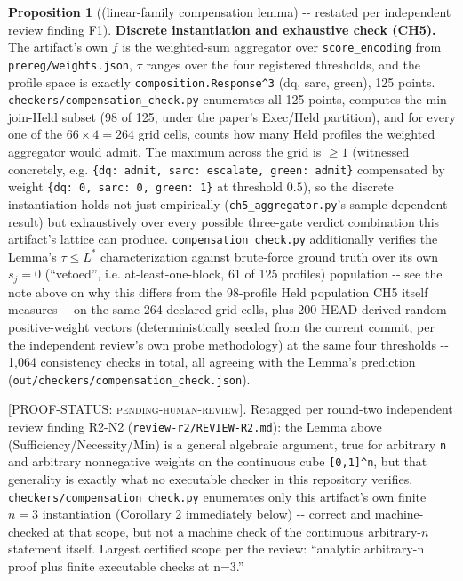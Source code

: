 \documentclass[11pt,a4paper]{article}
\theoremstyle{definition}
\newtheorem{proposition}{Proposition}
\newcommand{\proofstatus}[1]{[\textsc{PROOF-STATUS}: \textsc{#1}]}
\begin{document}
\begin{proposition}[(linear-family compensation lemma) -{}- restated per independent review finding F1]
\noindent\textbf{Discrete instantiation and exhaustive check (CH5).} The artifact's own $f$ is the weighted-sum aggregator over \texttt{score\_encoding} from \texttt{prereg/weights.json}, $\tau$ ranges over the four registered thresholds, and the profile space is exactly \texttt{composition.Response\textasciicircum3} (dq, sarc, green), 125 points. \texttt{checkers/compensation\_check.py} enumerates all 125 points, computes the min-join-Held subset (98 of 125, under the paper's Exec/Held partition), and for every one of the $66 \times 4 = 264$ grid cells, counts how many Held profiles the weighted aggregator would admit. The maximum across the grid is $\geq 1$ (witnessed concretely, e.g. \texttt{\{dq: admit, sarc: escalate, green: admit\}} compensated by weight \texttt{\{dq: 0, sarc: 0, green: 1\}} at threshold $0.5$), so the discrete instantiation holds not just empirically (\texttt{ch5\_aggregator.py}'s sample-dependent result) but exhaustively over every possible three-gate verdict combination this artifact's lattice can produce. \texttt{compensation\_check.py} additionally verifies the Lemma's $\tau \leq L^*$ characterization against brute-force ground truth over its own $s_j = 0$ (``vetoed'', i.e. at-least-one-block, 61 of 125 profiles) population -{}- see the note above on why this differs from the 98-profile Held population CH5 itself measures -{}- on the same 264 declared grid cells, plus 200 HEAD-derived random positive-weight vectors (deterministically seeded from the current commit, per the independent review's own probe methodology) at the same four thresholds -{}- 1,064 consistency checks in total, all agreeing with the Lemma's prediction (\texttt{out/checkers/compensation\_check.json}).

\proofstatus{pending-human-review}. Retagged per round-two independent review finding R2-N2 (\texttt{review-r2/REVIEW-R2.md}): the Lemma above (Sufficiency/Necessity/Min) is a general algebraic argument, true for arbitrary \texttt{n} and arbitrary nonnegative weights on the continuous cube \texttt{[0,1]\textasciicircum n}, but that generality is exactly what no executable checker in this repository verifies. \texttt{checkers/compensation\_check.py} enumerates only this artifact's own finite $n = 3$ instantiation (Corollary 2 immediately below) -{}- correct and machine-checked at that scope, but not a machine check of the continuous arbitrary-$n$ statement itself. Largest certified scope per the review: ``analytic arbitrary-n proof plus finite executable checks at n=3.''
\end{proposition}
\end{document}
